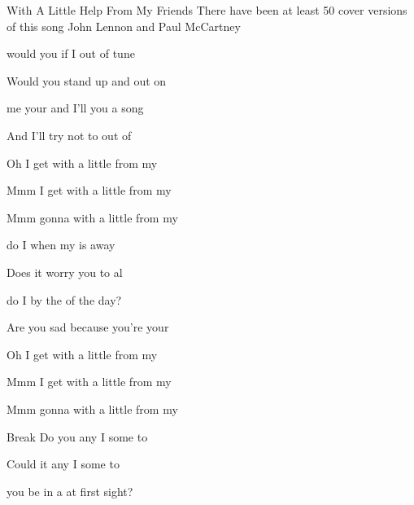 \begin{SBSong}{With A Little Help From My Friends}
  {There have been at least 50 cover versions of this song}
  {John Lennon and Paul McCartney}
  \begin{SBVerse}
	 would you  if I  out of tune 

	Would you stand up and  out on 

	 me your  and I'll  you a song 

	And I'll try not to  out of  
  \end{SBVerse}
  \begin{SBChorus}   
	Oh I get  with a little  from my 

	Mmm I get  with a little  from my 

	Mmm gonna  with a little  from my 
  \end{SBChorus}
  \begin{SBVerse}
	 do I  when my  is away 

	Does it worry you to  al

	do I  by the  of the day?

	Are you sad because you're  your  
  \end{SBVerse}
  \begin{SBChorus}  
	Oh I get  with a little  from my 

	Mmm I get  with a little  from my 

	Mmm gonna  with a little  from my 
  \end{SBChorus}
  \begin{SBBracket}{Break}
	Do you  any I  some to 

	Could it  any I  some to 
  \end{SBBracket}
  \CBPageBrk
  \begin{SBVerse}
	 you be in a  at first sight? 


\end{SBVerse}
\end{SBSong}
